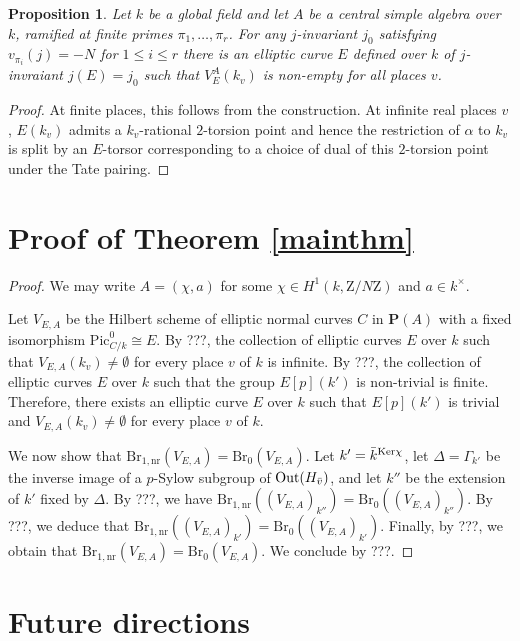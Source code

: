 \documentclass[10pt,letterpaper,twoside]{article}
\newcommand{\Z}{\mathrm{Z}}
\renewcommand{\1}{\mathbf{1}}
\newcommand{\bP}{\mathbf{P}}
\newcommand{\nr}{\mathrm{nr}}
\renewcommand{\leq}{\leqslant}
\newcommand{\Pic}{\mathrm{Pic}}
\newcommand{\Br}{\mathrm{Br}}
\newcommand{\iso}{\cong}
\theoremstyle{plain}
\newtheorem{proposition}[theorem]{Proposition}
\theoremstyle{plain}
\theoremstyle{definition}
\theoremstyle{named}
\theoremstyle{definition}
\begin{document}
\begin{proposition}
    Let $k$ be a global field and let $A$ be a central simple algebra over $k$, ramified at finite
    primes $\pi_1,\ldots,\pi_r$. For any $j$-invariant $j_0$ satisfying
    $v_{\pi_i}(j)=-N$ for $1\leq i\leq r$ there is an elliptic curve $E$ defined over $k$ of
    $j$-invraiant $j(E)=j_0$ such that $V_E^A(k_v)$ is non-empty for all places $v$.
\end{proposition}

\begin{proof}
    At finite places, this follows from the construction. At infinite real places $v$, $E(k_v)$ admits a
    $k_v$-rational $2$-torsion point and hence the restriction of $\alpha$ to $k_v$ is split by an
    $E$-torsor corresponding to a choice of dual of this $2$-torsion point under the Tate pairing.
\end{proof}



\section{Proof of Theorem \ref{mainthm}}

\begin{proof}
    We may write $A=(\chi,a)$ for some $\chi\in H^1(k,\Z/N\Z)$ and $a\in k^\times$. 
    
    Let $V_{E,A}$ be the Hilbert scheme of elliptic normal curves $C$ in $\bP(A)$ with a fixed isomorphism $\Pic_{C/k}^0\iso E$. By ???, the collection of elliptic curves $E$ over $k$ such that $V_{E,A}(k_v)\neq \emptyset$ for every place $v$ of $k$ is infinite. By ???, the collection of elliptic curves $E$ over $k$ such that the group $E[p](k')$ is non-trivial is finite. Therefore, there exists an elliptic curve $E$ over $k$ such that $E[p](k')$ is trivial and $V_{E,A}(k_v)\neq \emptyset$ for every place $v$ of $k$.

    We now show that $\Br_{1,\nr}(V_{E,A})=\Br_0(V_{E,A})$. Let $k'=\Bar{k}^{\mathrm{Ker}\chi}$, let $\Delta= \Gamma_{k'}$ be the inverse image of a $p$-Sylow subgroup of $\mathrm{Out}(H_{\Bar{v}})$, and let $k''$ be the extension of $k'$ fixed by $\Delta$. By ???, we have $\Br_{1,\nr}((V_{E,A})_{k''})=\Br_0((V_{E,A})_{k''})$. By ???, we deduce that $\Br_{1,\nr}((V_{E,A})_{k'})=\Br_0((V_{E,A})_{k'})$. Finally, by ???, we obtain that $\Br_{1,\nr}(V_{E,A})=\Br_0(V_{E,A})$. We conclude by ???.
    \end{proof}


\section{Future directions}
\end{document}

